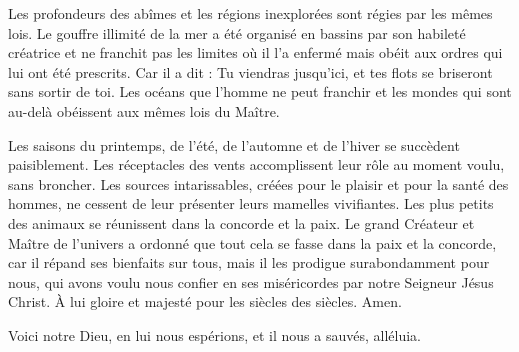
Les profondeurs des abîmes et les régions inexplorées sont régies par les mêmes lois.
Le gouffre illimité de la mer a été organisé en bassins par son habileté créatrice
	et ne franchit pas les limites où il l'a enfermé
	mais obéit aux ordres qui lui ont été prescrits.
Car il a dit : Tu viendras jusqu'ici, et tes flots se briseront sans sortir de toi.
Les océans que l'homme ne peut franchir et les mondes qui sont au-delà
	obéissent aux mêmes lois du Maître.


Les saisons du printemps, de l'été, de l'automne et de l'hiver se succèdent paisiblement.
Les réceptacles des vents accomplissent leur rôle au moment voulu, sans broncher.
Les sources intarissables, créées pour le plaisir et pour la santé des hommes,
	ne cessent de leur présenter leurs mamelles vivifiantes.
Les plus petits des animaux se réunissent dans la concorde et la paix.
Le grand Créateur et Maître de l'univers
	a ordonné que tout cela se fasse dans la paix et la concorde,
	car il répand ses bienfaits sur tous, mais il les prodigue surabondamment pour nous,
	qui avons voulu nous confier en ses miséricordes par notre Seigneur Jésus Christ.
À lui gloire et majesté pour les siècles des siècles. Amen.





Voici notre Dieu, en lui nous
espérions, et il nous a sauvés, alléluia.


